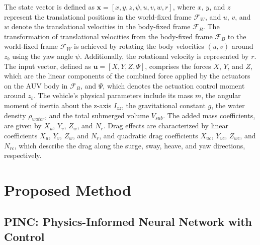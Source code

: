 The state vector is defined as $\mathbf{x} = [x, y, z, \psi, u, v, w, r]$, where $x$, $y$, and $z$ represent the translational positions in the world-fixed frame $\mathcal{F}_W$, and $u$, $v$, and $w$ denote the translational velocities in the body-fixed frame $\mathcal{F}_B$. The transformation of translational velocities from the body-fixed frame $\mathcal{F}_B$ to the world-fixed frame $\mathcal{F}_W$ is achieved by rotating the body velocities $(u, v)$ around $z_b$ using the yaw angle $\psi$. Additionally, the rotational velocity is represented by $r$. The input vector, defined as $\mathbf{u} = [X, Y, Z, \Psi]$, comprises the forces $X$, $Y$, and $Z$, which are the linear components of the combined force applied by the actuators on the AUV body in $\mathcal{F}_B$, and $\Psi$, which denotes the actuation control moment around $z_b$. 
The vehicle’s physical parameters include its mass $m$, the angular moment of inertia about the z-axis $I_{zz}$, the gravitational constant $g$, the water density $\rho_{water}$, and the total submerged volume $V_{sub}$. The added mass coefficients, are given by $X_{\dot{u}}$, $Y_{\dot{v}}$, $Z_{\dot{w}}$, and $N_{\dot{r}}$. Drag effects are characterized by linear coefficients $X_{u}$, $Y_{v}$, $Z_{w}$, and $N_{r}$, and quadratic drag coefficients $X_{uc}$, $Y_{vc}$, $Z_{wc}$, and $N_{rc}$, which describe the drag along the surge, sway, heave, and yaw directions, respectively.




\section{Proposed Method} %
\label{sec:method}

\subsection{PINC: Physics-Informed Neural Network with Control}

